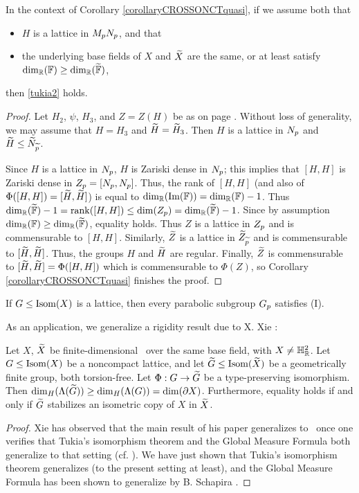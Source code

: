 {\begin{corollary}
\label{corollarylatticequasi}
In the context of Corollary \ref{corollaryCROSSONCTquasi}, if we assume both that
\begin{itemize}
\item[(I)] $H$ is a lattice in $M_p N_p$, and that
\item[(II)] the underlying base fields of $X$ and $\widetilde X$ are the same, or at least satisfy $\dim_\R(\F)\geq\dim_\R(\w\F)$,
\end{itemize}
then \eqref{tukia2} holds.
\end{corollary}
\begin{proof}
Let $H_2$, $\psi$, $H_3$, and $Z = Z(H)$ be as on page \pageref{lemmaCROSSONCTquasi}. Without loss of generality, we may assume that $H = H_3$ and $\widetilde H = \widetilde H_3$. Then $H$ is a lattice in $N_p$ and $\widetilde H\leq \widetilde N_{\widetilde{p}}$.

Since $H$ is a lattice in $N_p$, $H$ is Zariski dense in $N_p$; this implies that $[H,H]$ is Zariski dense in $Z_p = [N_p,N_p]$. Thus, the rank of $[H,H]$ (and also of $\Phi([H,H]) = [\widetilde H,\widetilde H]$) is equal to $\dim_\R(\Im(\F)) = \dim_\R(\F) - 1$. Thus $\dim_\R(\w\F) - 1 = \rank([H,H]) \leq \dim(Z_\bp) = \dim_\R(\w\F) - 1$. Since by assumption $\dim_\R(\F)\geq\dim_\R(\w\F)$, equality holds. Thus $Z$ is a lattice in $Z_p$ and is commensurable to $[H,H]$. Similarly, $\widetilde Z$ is a lattice in $\widetilde Z_{\widetilde{p}}$ and is commensurable to $[\widetilde H,\widetilde H]$. Thus, the groups $H$ and $\widetilde H$ are regular. Finally, $\widetilde Z$ is commensurable to $[\widetilde H,\widetilde H] = \Phi([H,H])$ which is commensurable to $\Phi(Z)$, so Corollary \ref{corollaryCROSSONCTquasi} finishes the proof.
\end{proof}

\begin{remark}
If $G\leq\operatorname{Isom}(X)$ is a lattice, then every parabolic subgroup $G_p$ satisfies (I).
\end{remark}

As an application, we generalize a rigidity result due to X. Xie \cite[Theorem 3.1]{Xie}:

\begin{corollary}
\label{corollaryxie}
Let $X$, $\widetilde X$ be finite-dimensional \ROSSs\ over the same base field, with $X\neq\H_\R^2$. Let $G\leq\operatorname{Isom}(X)$ be a noncompact lattice, and let $\widetilde G\leq\operatorname{Isom}(\widetilde X)$ be a geometrically finite group, both torsion-free. Let $\Phi:G\to \widetilde G$ be a type-preserving isomorphism. Then ${\dim_H}(\Lambda(\widetilde G)) \geq {\dim_H}(\Lambda(G)) = \dim(\partial X)$. Furthermore, equality holds if and only if $\widetilde G$ stabilizes an isometric copy of $X$ in $\widetilde X$.
\end{corollary}
\begin{proof}
Xie has observed that the main result of his paper generalizes to \ROSSs\ once one verifies that Tukia's isomorphism theorem and the Global Measure Formula both generalize to that setting (cf. \cite[p.1]{Xie}). We have just shown that Tukia's isomorphism theorem generalizes (to the present setting at least), and the Global Measure Formula has been shown to generalize by B. Schapira \cite[Th\'eor\`eme 3.2]{Schapira}.


\end{proof}}

